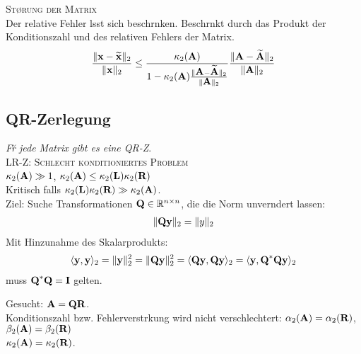 \textsc{St\o rung der Matrix}\\
Der relative Fehler l\a sst sich beschr\a nken. Beschr\a nkt durch das Produkt der Konditionszahl und des relativen Fehlers der Matrix.
\begin{align*}
\frac{\Vert \mbox{\bf x} - \widetilde{\mbox{\bf x}} \Vert_2}{\Vert \mbox{\bf x} \Vert_2} \leq \dfrac{\kappa_2(\mbox{\bf A})}{1-\kappa_2(\mbox{\bf A})\frac{\Vert \mbox{\bf A} - \widetilde{\mbox{\bf A}} \Vert_2}{\Vert \mbox{\bf A} \Vert_2} } \frac{\Vert \mbox{\bf A} - \widetilde{\mbox{\bf A}} \Vert_2}{\Vert \mbox{\bf A} \Vert_2}
\end{align*}

\subsection{QR-Zerlegung}
\emph{F\u r jede Matrix gibt es eine QR-Z}.\\

\textsc{LR-Z: Schlecht konditioniertes Problem}\\
$\kappa_2(\mbox{\bf A}) \gg 1$, $\kappa_2(\mbox{\bf A}) \leq \kappa_2(\mbox{\bf L})\kappa_2(\mbox{\bf R})$\\
Kritisch falls $\kappa_2(\mbox{\bf L})\kappa_2(\mbox{\bf R}) \gg \kappa_2(\mbox{\bf A})$.\\

Ziel: Suche Transformationen $\mbox{\bf Q} \in \mathbb{R}^{n \times n}$, die die Norm unver\a ndert lassen:
\begin{align*}
\Vert \mbox{\bf Qy} \Vert_2 = \Vert y \Vert_2
\end{align*}
Mit Hinzunahme des Skalarprodukts:
\begin{align*}
\langle \mbox{\bf y}, \mbox{\bf y} \rangle_2 = \Vert \mbox{\bf y} \Vert_2^2 = \Vert \mbox{\bf Qy} \Vert_2^2 = \langle \mbox{\bf Qy}, \mbox{\bf Qy} \rangle_2 = \langle \mbox{\bf y}, \mbox{\bf Q}^*\mbox{\bf Qy} \rangle_2
\end{align*}
muss $\mbox{\bf Q}^*\mbox{\bf Q} = \mbox{\bf I}$ gelten.

Gesucht: $\mbox{\bf A}=\mbox{\bf QR}$.\\
Konditionszahl bzw. Fehlerverst\a rkung wird nicht verschlechtert: $\alpha_2(\mbox{\bf A}) = \alpha_2(\mbox{\bf R})$, $\beta_2(\mbox{\bf A}) = \beta_2(\mbox{\bf R})$\\
$\kappa_2(\mbox{\bf A})= \kappa_2(\mbox{\bf R})$.\\

